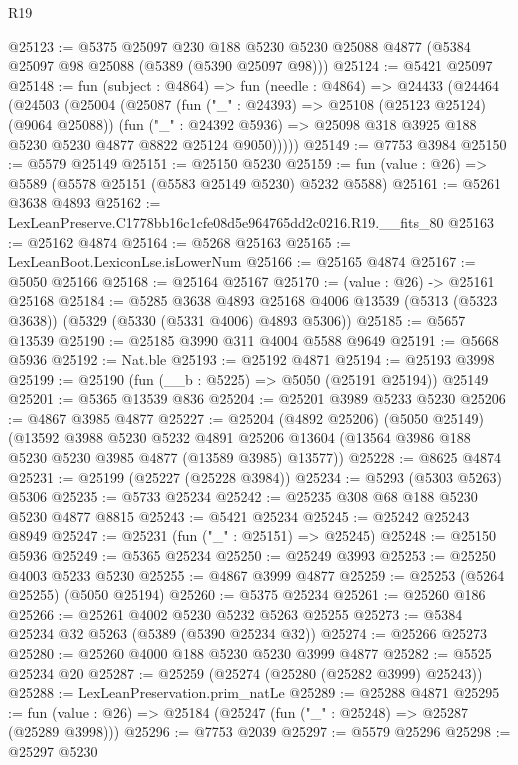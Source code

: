 \begin{lexlean}{R19}
\begin{coremodule}
@25123 := @5375
    @25097
    @230
    @188
    @5230
    @5230
    @25088
    @4877
    (@5384 @25097 @98 @25088 (@5389 (@5390 @25097 @98)))
@25124 := @5421 @25097
@25148 := fun (subject : @4864) =>
  fun (needle : @4864) =>
  @24433
    (@24464
      (@24503
        (@25004
          (@25087
            (fun ("_" : @24393) => @25108 (@25123 @25124) (@9064 @25088))
            (fun ("_" : @24392 @5936) =>
            @25098 @318 @3925 @188 @5230 @5230 @4877 @8822 @25124 @9050)))))
@25149 := @7753 @3984
@25150 := @5579 @25149
@25151 := @25150 @5230
@25159 := fun (value : @26) => @5589 (@5578 @25151 (@5583 @25149 @5230) @5232 @5588)
@25161 := @5261 @3638 @4893
@25162 := LexLeanPreserve.C1778bb16c1cfe08d5e964765dd2c0216.R19.__fits_80
@25163 := @25162 @4874
@25164 := @5268 @25163
@25165 := LexLeanBoot.LexiconLse.isLowerNum
@25166 := @25165 @4874
@25167 := @5050 @25166
@25168 := @25164 @25167
@25170 := (value : @26) -> @25161 @25168
@25184 := @5285
    @3638
    @4893
    @25168
    @4006
    @13539
    (@5313 (@5323 @3638))
    (@5329 (@5330 (@5331 @4006) @4893 @5306))
@25185 := @5657 @13539
@25190 := @25185 @3990 @311 @4004 @5588 @9649
@25191 := @5668 @5936
@25192 := Nat.ble
@25193 := @25192 @4871
@25194 := @25193 @3998
@25199 := @25190 (fun (__b : @5225) => @5050 (@25191 @25194)) @25149
@25201 := @5365 @13539 @836
@25204 := @25201 @3989 @5233 @5230
@25206 := @4867 @3985 @4877
@25227 := @25204
    (@4892 @25206)
    (@5050 @25149)
    (@13592
      @3988
      @5230
      @5232
      @4891
      @25206
      @13604
      (@13564 @3986 @188 @5230 @5230 @3985 @4877 (@13589 @3985) @13577))
@25228 := @8625 @4874
@25231 := @25199 (@25227 (@25228 @3984))
@25234 := @5293 (@5303 @5263) @5306
@25235 := @5733 @25234
@25242 := @25235 @308 @68 @188 @5230 @5230 @4877 @8815
@25243 := @5421 @25234
@25245 := @25242 @25243 @8949
@25247 := @25231 (fun ("_" : @25151) => @25245)
@25248 := @25150 @5936
@25249 := @5365 @25234
@25250 := @25249 @3993
@25253 := @25250 @4003 @5233 @5230
@25255 := @4867 @3999 @4877
@25259 := @25253 (@5264 @25255) (@5050 @25194)
@25260 := @5375 @25234
@25261 := @25260 @186
@25266 := @25261 @4002 @5230 @5232 @5263 @25255
@25273 := @5384 @25234 @32 @5263 (@5389 (@5390 @25234 @32))
@25274 := @25266 @25273
@25280 := @25260 @4000 @188 @5230 @5230 @3999 @4877
@25282 := @5525 @25234 @20
@25287 := @25259 (@25274 (@25280 (@25282 @3999) @25243))
@25288 := LexLeanPreservation.prim_natLe
@25289 := @25288 @4871
@25295 := fun (value : @26) => @25184 (@25247 (fun ("_" : @25248) => @25287 (@25289 @3998)))
@25296 := @7753 @2039
@25297 := @5579 @25296
@25298 := @25297 @5230

\end{coremodule}
\end{lexlean}
